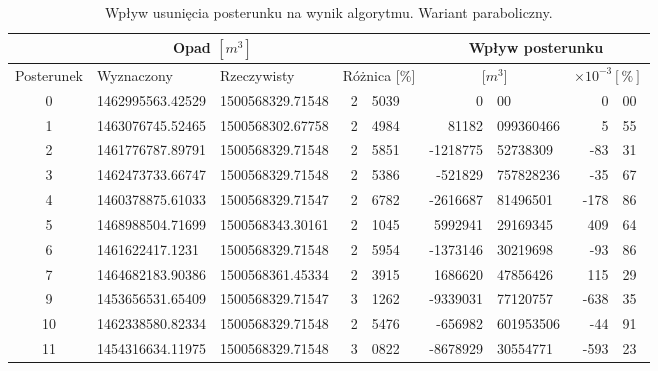 \begin{table}
\label{tab:wyniki_wymierna}
\caption{Wpływ usunięcia posterunku na wynik algorytmu. Wariant paraboliczny.}
\begin{center}
\begin{tabular}{|c|l|l|r@{.}l|r@{.}l|r@{.}l|}
\cline{2-3} \cline{6-9}
\multicolumn{1}{l}{} & \multicolumn{2}{|c|}{Opad $[m^3]$} & \multicolumn{2}{c}{} & \multicolumn{4}{|c|}{Wpływ posterunku} \\
\hline Posterunek & Wyznaczony & Rzeczywisty & \multicolumn{2}{c}{Różnica [\%]} & \multicolumn{2}{|c|}{[$m^3$]}& \multicolumn{2}{|c|}{$\times 10^{-3} [\%]$} \\ \hline \hline

0   &     1462995563.42529   &    1500568329.71548    &      2 & 5039  &             0 & 00          &     0 & 00 \\ \hline
1   &     1463076745.52465   &    1500568302.67758    &      2 & 4984  &         81182 & 099360466   &     5 & 55 \\ \hline
2   &     1461776787.89791   &    1500568329.71548    &      2 & 5851  &      -1218775 & 52738309    &   -83 & 31 \\ \hline
3   &     1462473733.66747   &    1500568329.71548    &      2 & 5386  &       -521829 & 757828236   &   -35 & 67 \\ \hline
4   &     1460378875.61033   &    1500568329.71547    &      2 & 6782  &      -2616687 & 81496501    &  -178 & 86 \\ \hline
5   &     1468988504.71699   &    1500568343.30161    &      2 & 1045  &       5992941 & 29169345    &   409 & 64 \\ \hline
6   &     1461622417.1231    &    1500568329.71548    &      2 & 5954  &      -1373146 & 30219698    &   -93 & 86 \\ \hline
7   &     1464682183.90386   &    1500568361.45334    &      2 & 3915  &       1686620 & 47856426    &   115 & 29 \\ \hline
9   &     1453656531.65409   &    1500568329.71547    &      3 & 1262  &      -9339031 & 77120757    &  -638 & 35 \\ \hline
10  &     1462338580.82334   &    1500568329.71548    &      2 & 5476  &       -656982 & 601953506   &   -44 & 91 \\ \hline
11  &     1454316634.11975   &    1500568329.71548    &      3 & 0822  &      -8678929 & 30554771    &  -593 & 23 \\ \hline

\end{tabular}
\end{center}
\end{table}
